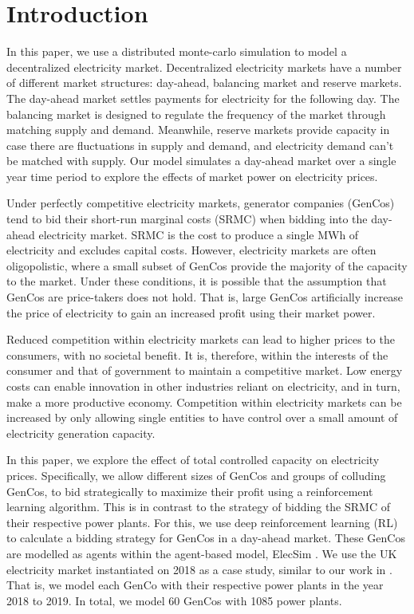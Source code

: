 \documentclass[conference]{IEEEtran}
\begin{document}
\section{Introduction}
\label{sec:introduction}

In this paper, we use a distributed monte-carlo simulation to model a decentralized electricity market. Decentralized electricity markets have a number of different market structures: day-ahead, balancing market and reserve markets. The day-ahead market settles payments for electricity for the following day. The balancing market is designed to regulate the frequency of the market through matching supply and demand. Meanwhile, reserve markets provide capacity in case there are fluctuations in supply and demand, and electricity demand can't be matched with supply. Our model simulates a day-ahead market over a single year time period to explore the effects of market power on electricity prices.

Under perfectly competitive electricity markets, generator companies (GenCos) tend to bid their short-run marginal costs (SRMC) when bidding into the day-ahead electricity market. SRMC is the cost to produce a single MWh of electricity and excludes capital costs. However, electricity markets are often oligopolistic, where a small subset of GenCos provide the majority of the capacity to the market. Under these conditions, it is possible that the assumption that GenCos are price-takers does not hold. That is, large GenCos artificially increase the price of electricity to gain an increased profit using their market power. 

Reduced competition within electricity markets can lead to higher prices to the consumers, with no societal benefit. It is, therefore, within the interests of the consumer and that of government to maintain a competitive market. Low energy costs can enable innovation in other industries reliant on electricity, and in turn, make a more productive economy. Competition within electricity markets can be increased by only allowing single entities to have control over a small amount of electricity generation capacity.

In this paper, we explore the effect of total controlled capacity on electricity prices. Specifically, we allow different sizes of GenCos and groups of colluding GenCos, to bid strategically to maximize their profit using a reinforcement learning algorithm. This is in contrast to the strategy of bidding the SRMC of their respective power plants. For this, we use deep reinforcement learning (RL) to calculate a bidding strategy for GenCos in a day-ahead market. These GenCos are modelled as agents within the agent-based model, ElecSim \cite{Kell, Kell2020}. We use the UK electricity market instantiated on 2018 as a case study, similar to our work in \cite{Kell2019a}. That is, we model each GenCo with their respective power plants in the year 2018 to 2019. In total, we model 60 GenCos with 1085 power plants.
\end{document}
